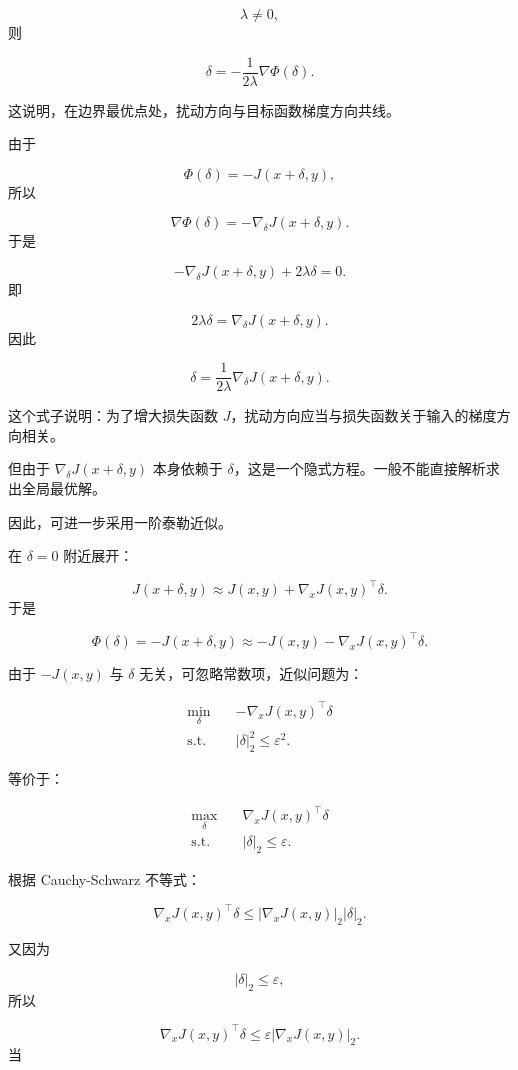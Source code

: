 ﻿\documentclass[UTF8,zihao=-4,fontset=none]{ctexart}
\begin{document}
\[
\lambda\ne 0,
\]
\noindent 则

\[
\delta
=
-\frac{1}{2\lambda}\nabla\Phi(\delta).
\]

这说明，在边界最优点处，扰动方向与目标函数梯度方向共线。

由于

\[
\Phi(\delta)=-J(x+\delta,y),
\]
\noindent 所以

\[
\nabla \Phi(\delta)
=
-\nabla_\delta J(x+\delta,y).
\]
\noindent 于是

\[
-\nabla_\delta J(x+\delta,y)+2\lambda\delta=0.
\]
\noindent 即

\[
2\lambda\delta
=
\nabla_\delta J(x+\delta,y).
\]
\noindent 因此

\[
\delta
=
\frac{1}{2\lambda}
\nabla_\delta J(x+\delta,y).
\]

这个式子说明：为了增大损失函数 \(J\)，扰动方向应当与损失函数关于输入的梯度方向相关。

但由于 \(\nabla_\delta J(x+\delta,y)\) 本身依赖于 \(\delta\)，这是一个隐式方程。一般不能直接解析求出全局最优解。

因此，可进一步采用一阶泰勒近似。

在 \(\delta=0\) 附近展开：

\[
J(x+\delta,y)
\approx
J(x,y)+\nabla_xJ(x,y)^\top\delta.
\]
\noindent 于是

\[
\Phi(\delta)
=
-J(x+\delta,y)
\approx
-J(x,y)-\nabla_xJ(x,y)^\top\delta.
\]

由于 \(-J(x,y)\) 与 \(\delta\) 无关，可忽略常数项，近似问题为：

\[
\begin{aligned}
\min_{\delta}
\quad
&
-\nabla_xJ(x,y)^\top\delta\\
\mathrm{s.t.}
\quad
&
|\delta|_2^2\le \varepsilon^2.
\end{aligned}
\]

等价于：

\[
\begin{aligned}
\max_{\delta}
\quad
&
\nabla_xJ(x,y)^\top\delta\\
\mathrm{s.t.}
\quad
&
|\delta|_2\le \varepsilon.
\end{aligned}
\]

根据 Cauchy-Schwarz 不等式：

\[
\nabla_xJ(x,y)^\top\delta
\le
|\nabla_xJ(x,y)|_2|\delta|_2.
\]

又因为

\[
|\delta|_2\le \varepsilon,
\]
\noindent 所以

\[
\nabla_xJ(x,y)^\top\delta
\le
\varepsilon |\nabla_xJ(x,y)|_2.
\]
\noindent 当
\end{document}
